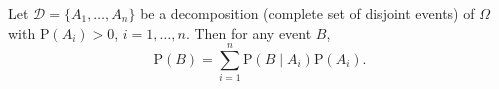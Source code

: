 Let $\mathcal{D} = \{A_1, \ldots, A_n\}$ be a decomposition (complete set of disjoint events) of $\Omega$ with $\text{P}(A_i) > 0$, $i = 1, \ldots, n$. Then for any event $B$,
$$\text{P}(B) = \sum_{i=1}^{n} \text{P}(B \mid A_i) \text{P}(A_i).$$
